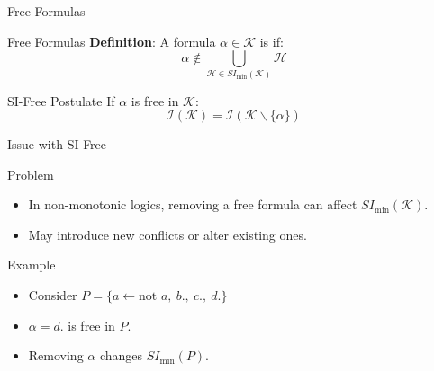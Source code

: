\begin{frame}{Free Formulas}
    \begin{block}{Free Formulas}
        \textbf{Definition}: A formula \( \alpha \in \mathcal{K} \) is  if:
        \[
            \alpha \notin \bigcup\limits_{\mathcal{H} \in SI_{\min}(\mathcal{K})} \mathcal{H}
        \]
    \end{block}
    \begin{block}{SI-Free Postulate}
        If \( \alpha \) is free in \( \mathcal{K} \):
        \[
            \mathcal{I}(\mathcal{K}) = \mathcal{I}(\mathcal{K} \backslash \{\alpha\})
        \]
    \end{block}
\end{frame}

\begin{frame}{Issue with SI-Free}
    \begin{alertblock}{Problem}
        \begin{itemize}
            \item In non-monotonic logics, removing a free formula can affect \( SI_{\min}(\mathcal{K}) \).
            \item May introduce new conflicts or alter existing ones.
        \end{itemize}
    \end{alertblock}
    \begin{exampleblock}{Example}
        \begin{itemize}
            \item Consider \( P = \{ a \leftarrow \text{not } a,\ b.,\ c.,\ d. \} \)
            \item \( \alpha = d. \) is free in \( P \).
            \item Removing \( \alpha \) changes \( SI_{\min}(P) \).
        \end{itemize}
    \end{exampleblock}
\end{frame}

